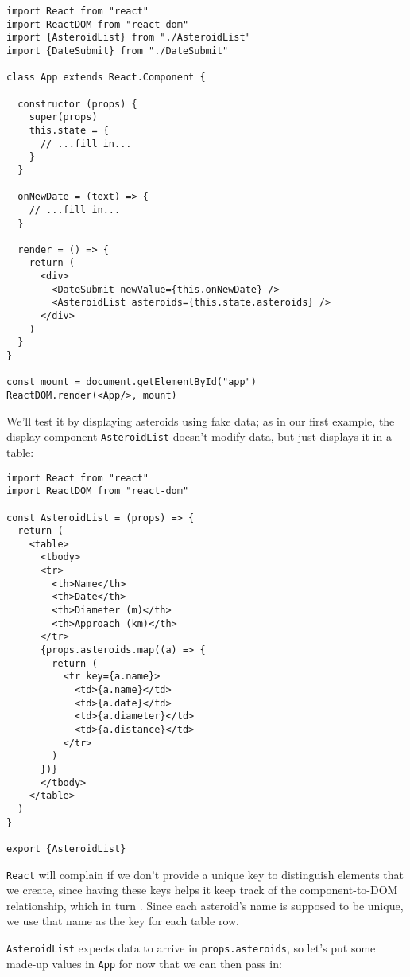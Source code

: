 \begin{verbatim}
import React from "react"
import ReactDOM from "react-dom"
import {AsteroidList} from "./AsteroidList"
import {DateSubmit} from "./DateSubmit"

class App extends React.Component {

  constructor (props) {
    super(props)
    this.state = {
      // ...fill in...
    }
  }

  onNewDate = (text) => {
    // ...fill in...
  }

  render = () => {
    return (
      <div>
        <DateSubmit newValue={this.onNewDate} />
        <AsteroidList asteroids={this.state.asteroids} />
      </div>
    )
  }
}

const mount = document.getElementById("app")
ReactDOM.render(<App/>, mount)
\end{verbatim}

We'll test it by displaying asteroids using fake data;
as in our first example,
the display component \texttt{AsteroidList} doesn't modify data,
but just displays it in a table:

\begin{verbatim}
import React from "react"
import ReactDOM from "react-dom"

const AsteroidList = (props) => {
  return (
    <table>
      <tbody>
      <tr>
        <th>Name</th>
        <th>Date</th>
        <th>Diameter (m)</th>
        <th>Approach (km)</th>
      </tr>
      {props.asteroids.map((a) => {
        return (
          <tr key={a.name}>
            <td>{a.name}</td>
            <td>{a.date}</td>
            <td>{a.diameter}</td>
            <td>{a.distance}</td>
          </tr>
        )
      })}
      </tbody>
    </table>
  )
}

export {AsteroidList}
\end{verbatim}

\texttt{React} will complain if we don't provide a unique key
to distinguish elements that we create,
since having these keys helps it keep track of the component-to-DOM relationship,
which in turn .
Since each asteroid's name is supposed to be unique,
we use that name as the key for each table row.

\texttt{AsteroidList} expects data to arrive in \texttt{props.asteroids},
so let's put some made-up values in \texttt{App} for now
that we can then pass in:

